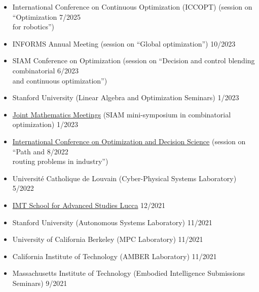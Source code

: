 \documentclass[11pt,a4paper,sans]{moderncv}
\begin{document}
\begin{itemize}

\item
International Conference on Continuous Optimization (ICCOPT)  (session on ``Optimization \hfill 7/2025 \\ for robotics'') 


\item
INFORMS Annual Meeting (session on ``Global optimization'') \hfill 10/2023

\item
SIAM Conference on Optimization (session on ``Decision and control blending combinatorial \hfill 6/2023 \\ and continuous optimization'')
\item
Stanford University (Linear Algebra and Optimization Seminars) \hfill 1/2023

\item \href{https://www.jointmathematicsmeetings.org/meetings/national/jmm2023/2270_program.html}{\color{cyan}Joint Mathematics Meetings} (SIAM mini-symposium in combinatorial optimization)  \hfill 1/2023

\item \href{http://www.airoconference.it/ods2022/}{\color{cyan}International Conference on Optimization and Decision Science} (session on ``Path and \hfill 8/2022 \\ routing problems in industry'') 


\item Universit\'e Catholique de Louvain (Cyber-Physical Systems Laboratory) \hfill 5/2022

\item \href{https://www.imtlucca.it/en/eventonew/shortest-paths-graphs-of-convex-sets}{\color{cyan}IMT School for Advanced Studies Lucca} \hfill 12/2021

\item Stanford University (Autonomous Systems Laboratory) \hfill 11/2021

\item University of California Berkeley (MPC Laboratory) \hfill 11/2021

\item California Institute of Technology (AMBER Laboratory) \hfill 11/2021

\item Massachusetts Institute of Technology (Embodied Intelligence Submissions Seminars) \hfill 9/2021


\end{itemize}
\end{document}
